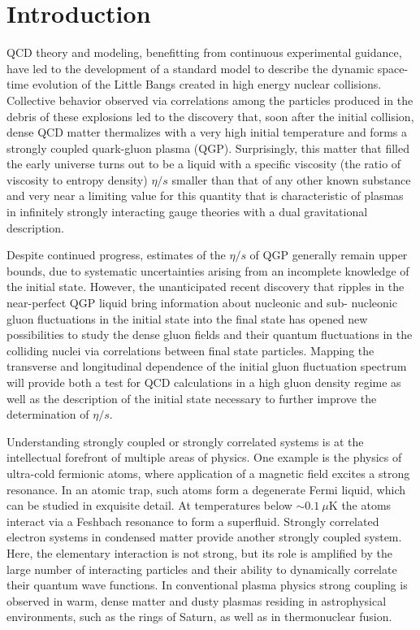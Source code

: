 \section{Introduction}
\label{Sec:Introduction}

QCD theory and modeling, benefitting from continuous experimental guidance, have led to the development of a standard model to describe the dynamic space-time evolution of the Little Bangs created in high energy nuclear collisions\cite{Heinz:2013wva}. Collective behavior observed via correlations among the particles produced in the debris of these explosions led to the discovery that, soon after the initial collision, dense QCD matter thermalizes with a very high initial temperature and forms a strongly coupled quark-gluon plasma (QGP). Surprisingly, this matter that filled the early universe turns out to be a liquid with a specific viscosity (the ratio of viscosity to entropy density)  $\eta/s$ smaller than that of any other known substance\cite{Csernai:2006zz,Gale:2012rq} and very near a limiting value for this quantity that is characteristic of plasmas in infinitely strongly interacting gauge theories with a dual gravitational description\cite{Kovtun:2004de}.

Despite continued progress, estimates of the $\eta/s$ of QGP generally remain upper bounds, due to systematic uncertainties arising from an incomplete knowledge of the initial state. However, the unanticipated recent discovery that ripples in the near-perfect QGP liquid bring information about nucleonic and sub- nucleonic gluon fluctuations in the initial state into the final state\cite{Gale:2012in} has opened new possibilities to study the dense gluon fields and their quantum fluctuations in the colliding nuclei via correlations between final state particles. Mapping the transverse and longitudinal dependence of the initial gluon fluctuation spectrum will provide both a test for QCD calculations in a high gluon density regime as well as the description of the initial state necessary to further improve the determination of $\eta/s$.

Understanding strongly coupled or strongly correlated systems is at the intellectual forefront of multiple areas of physics. One example is the physics of ultra-cold fermionic atoms, where application of a magnetic field excites a strong resonance. In an atomic trap, such atoms form a degenerate Fermi liquid, which can be studied in exquisite detail\cite{O'Hara:2002zz}. At temperatures below $\sim 0.1\ \mu\mathrm{K}$ the atoms interact via a Feshbach resonance to form a superfluid\cite{Kinast:2004zza}. Strongly correlated electron systems in condensed matter provide another strongly coupled system\cite{Rameau:2014gma}. Here, the elementary interaction is not strong, but its role is amplified by the large number of interacting particles and their ability to dynamically correlate their quantum wave functions. In conventional plasma physics strong coupling is observed in warm, dense matter and dusty plasmas\cite{Chan:2004} residing in astrophysical environments, such as the rings of Saturn, as well as in thermonuclear fusion.


